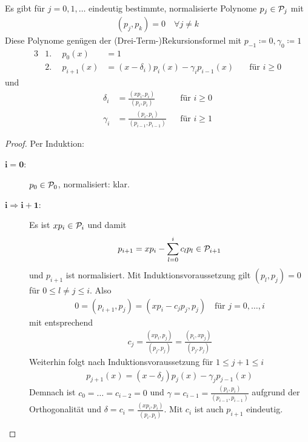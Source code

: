 \documentclass[ngerman,fontsize=11pt, paper=a4, parskip=half, titlepage=true, toc=bib]{scrbook}
\begin{document}
\begin{Satze}\label{7.4.4}
  Es gibt für $j=0,1,\ldots$ eindeutig bestimmte, normalisierte
Polynome $p_j\in\mathcal{P}_j$ mit 
\begin{gather*}
  (p_j,p_k) =0 \quad \forall j\neq k
\end{gather*}
Diese Polynome genügen der (Drei-Term-)Rekursionsformel 
 mit 
$p_{-1}\coloneqq 0, \gamma_0\coloneqq 1$
\begin{alignat}{3}
  \nonumber
  &1.~~&p_0(x)&=1 \\
  &2.~~&p_{i+1}(x)&=(x-\delta_i)p_i(x)-\gamma_ip_{i-1}(x)
                    &\quad \text{für  }i\geq 0
\label{VII.4.3} 
\end{alignat}
und
\begin{align}
  \nonumber
  \delta_i &=\frac{(xp_i,p_i)}{(p_i,p_i)}
  &&\text{für }i\geq 0 \\
  \gamma_i &=\frac{(p_i,p_i)}{(p_{i-1},p_{i-1})}
  &&\text{für }i\geq 1
  \label{VII.4.4}     
\end{align}

\begin{proof}
  Per Induktion:
\begin{description}
  \item[$\boldsymbol{i=0}$:] $p_0\in\mathcal{P}_0$, normalisiert: klar.
  \item[$\boldsymbol{i\Rightarrow i+1}$:]  Es ist $xp_i\in\mathcal{P}_i$
    und damit
    \begin{gather*}
      p_{i+1}=xp_i-\sum_{l=0}^ic_lp_l\in\mathcal{P}_{i+1}
    \end{gather*}
    und $p_{i+1}$ ist normalisiert.
    Mit Induktionsvoraussetzung gilt $(p_l,p_j)=0$ 
    für $0\leq l\neq j\leq i$. Also 
  \begin{gather*}
    0=(p_{i+1},p_j) = (xp_i-c_jp_j, p_j) \quad \text{für } j=0,\ldots, i
  \end{gather*}
  mit entsprechend 
  \begin{gather*}
    c_j=\frac{(xp_i,p_j)}{(p_j,p_j)} = \frac{(p_i,xp_j)}{(p_j,p_j)}
  \end{gather*}
  Weiterhin folgt nach Induktionsvoraussetzung für $1\leq j+1\leq i$
  \begin{gather*}
    p_{j+1}(x)=(x-\delta_j)p_j(x) -\gamma_jp_{j-1}(x)
  \end{gather*}
Demnach ist $c_0=\ldots=c_{i-2}=0$ und
$\gamma=c_{i-1}=\frac{(p_i,p_i)}{(p_{i-1},p_{i-1})}$
aufgrund der Orthogonalität
und $\delta=c_i=\frac{(xp_i,p_i)}{(p_i,p_i)}$.
Mit $c_i$ ist auch $p_{i+1}$ eindeutig.
\end{description}
\end{proof}
\end{Satze}
\end{document}
